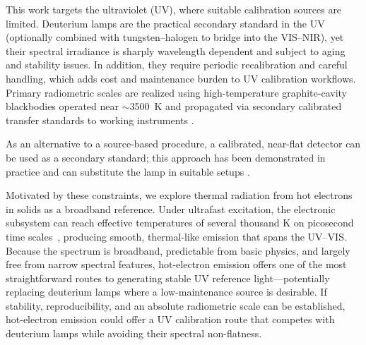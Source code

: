 \documentclass[
	parskip=half,
	a4paper,
]{scrarticle}
\begin{document}
This work targets the ultraviolet (UV), where suitable calibration sources are limited. Deuterium lamps are the practical secondary standard in the UV (optionally combined with tungsten–halogen to bridge into the VIS–NIR), yet their spectral irradiance is sharply wavelength dependent and subject to aging and stability issues. In addition, they require periodic recalibration and careful handling, which adds cost and maintenance burden to UV calibration workflows. Primary radiometric scales are realized using high-temperature graphite-cavity blackbodies operated near $\sim$\SI{3500}{\kelvin} and propagated via secondary calibrated transfer standards to working instruments \cite{yoonNISTMeasurementServices2011, sapritskyBlackbodyRadiometry1995}.

As an alternative to a source-based procedure, a calibrated, near-flat detector can be used as a secondary standard; this approach has been demonstrated in practice and can substitute the lamp in suitable setups \cite{larasonNISTHighAccuracy1996}.

Motivated by these constraints, we explore thermal radiation from hot electrons in solids as a broadband reference. Under ultrafast excitation, the electronic subsystem can reach effective temperatures of several thousand \si{\kelvin} on picosecond time scales~\cite{luiUltrafastPhotoluminescenceGraphene2010}, producing smooth, thermal-like emission that spans the UV–VIS. Because the spectrum is broadband, predictable from basic physics, and largely free from narrow spectral features, hot-electron emission offers one of the most straightforward routes to generating stable UV reference light—potentially replacing deuterium lamps where a low-maintenance source is desirable. If stability, reproducibility, and an absolute radiometric scale can be established, hot-electron emission could offer a UV calibration route that competes with deuterium lamps while avoiding their spectral non-flatness.
\end{document}
